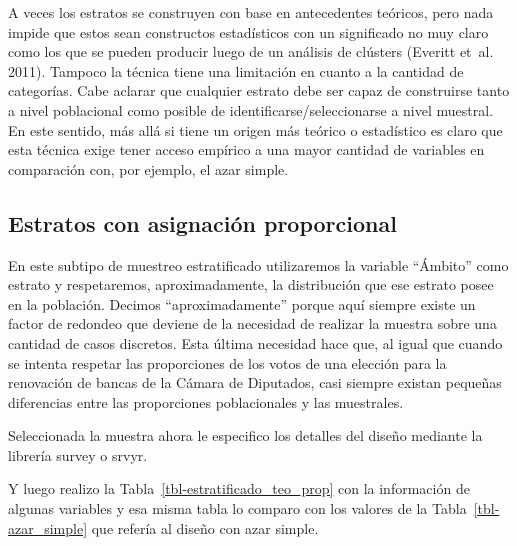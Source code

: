 \documentclass[
  spanish,
  a4paper,
]{scrreprt}
\begin{document}
A veces los estratos se construyen con base en antecedentes teóricos,
pero nada impide que estos sean constructos estadísticos con un
significado no muy claro como los que se pueden producir luego de un
análisis de clústers (Everitt et~al. 2011). Tampoco la técnica tiene una
limitación en cuanto a la cantidad de categorías. Cabe aclarar que
cualquier estrato debe ser capaz de construirse tanto a nivel
poblacional como posible de identificarse/seleccionarse a nivel
muestral. En este sentido, más allá si tiene un origen más teórico o
estadístico es claro que esta técnica exige tener acceso empírico a una
mayor cantidad de variables en comparación con, por ejemplo, el azar
simple.

\subsection{Estratos con asignación
proporcional}\label{sec-estrato_proporcional}

En este subtipo de muestreo estratificado utilizaremos la variable
``Ámbito'' como estrato y respetaremos, aproximadamente, la distribución
que ese estrato posee en la población. Decimos ``aproximadamente''
porque aquí siempre existe un factor de redondeo que deviene de la
necesidad de realizar la muestra sobre una cantidad de casos discretos.
Esta última necesidad hace que, al igual que cuando se intenta respetar
las proporciones de los votos de una elección para la renovación de
bancas de la Cámara de Diputados, casi siempre existan pequeñas
diferencias entre las proporciones poblacionales y las muestrales.

Seleccionada la muestra ahora le especifico los detalles del diseño
mediante la librería survey o srvyr.

Y luego realizo la Tabla~\ref{tbl-estratificado_teo_prop} con la
información de algunas variables y esa misma tabla lo comparo con los
valores de la Tabla~\ref{tbl-azar_simple} que refería al diseño con azar
simple.
\end{document}
